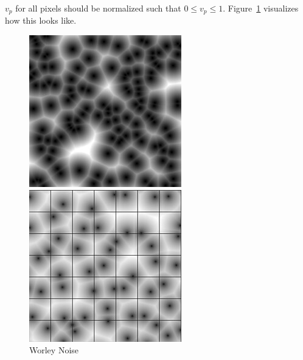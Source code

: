 $v_p$ for all pixels should be normalized such that $0 \le v_p \le 1$. Figure~\ref{fig:worley_eg} visualizes how this looks like.

\begin{figure}[H]
    \centering
    \begin{minipage}[t]{0.45\textwidth}
        \centering
        \includegraphics[width=\textwidth]{images/worley.jpg}
        \caption{Worley Noise \cite{wikipedia_worley} }
        \label{fig:worley_eg}
    \end{minipage}
    \hfill
    \begin{minipage}[t]{0.45\textwidth}
        \centering
        \includegraphics[width=\textwidth]{images/worley_with_grid.jpg}

\end{minipage}
\end{figure}
